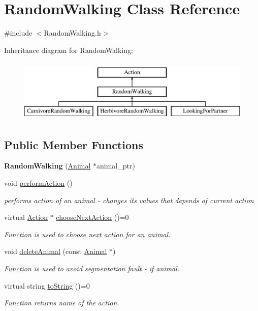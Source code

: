 \hypertarget{class_random_walking}{}\section{Random\+Walking Class Reference}
\label{class_random_walking}


{\ttfamily \#include $<$Random\+Walking.\+h$>$}

Inheritance diagram for Random\+Walking\+:\begin{figure}[H]
\begin{center}
\leavevmode
\includegraphics[height=3.000000cm]{class_random_walking}
\end{center}
\end{figure}
\subsection*{Public Member Functions}
\begin{DoxyCompactItemize}
\item 
\hypertarget{class_random_walking_a2d78b8e5754d3d12db4811a2f922a963}{}{\bfseries Random\+Walking} (\hyperlink{class_animal}{Animal} $\ast$animal\+\_\+ptr)\label{class_random_walking_a2d78b8e5754d3d12db4811a2f922a963}

\item 
void \hyperlink{class_random_walking_a04a3fc96e180a6c0ab0af7d29e596082}{perform\+Action} ()
\begin{DoxyCompactList}\small\item\em performs action of an animal -\/ changes it\textquotesingle{}s values that depends of current action \end{DoxyCompactList}\item 
virtual \hyperlink{class_action}{Action} $\ast$ \hyperlink{class_random_walking_a7bfc651d40fd17944ed8efcdf58e0559}{choose\+Next\+Action} ()=0
\begin{DoxyCompactList}\small\item\em Function is used to choose next action for an animal. \end{DoxyCompactList}\item 
void \hyperlink{class_random_walking_af8be73eaa8ef5e21f0b127a32b34d4ad}{delete\+Animal} (const \hyperlink{class_animal}{Animal} $\ast$)
\begin{DoxyCompactList}\small\item\em Function is used to avoid segmentation fault -\/ if animal. \end{DoxyCompactList}\item 
virtual string \hyperlink{class_random_walking_a86f089cc5cc28d179e248c67477e8b30}{to\+String} ()=0
\begin{DoxyCompactList}\small\item\em Function returns name of the action. \end{DoxyCompactList}\end{DoxyCompactItemize}
